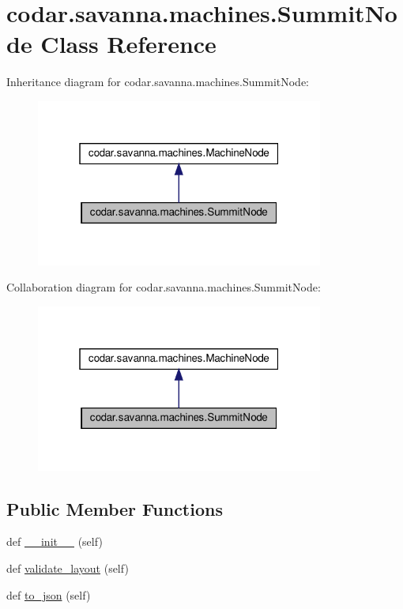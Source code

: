 \hypertarget{classcodar_1_1savanna_1_1machines_1_1_summit_node}{}\section{codar.\+savanna.\+machines.\+Summit\+Node Class Reference}
\label{classcodar_1_1savanna_1_1machines_1_1_summit_node}


Inheritance diagram for codar.\+savanna.\+machines.\+Summit\+Node\+:
\nopagebreak
\begin{figure}[H]
\begin{center}
\leavevmode
\includegraphics[width=268pt]{classcodar_1_1savanna_1_1machines_1_1_summit_node__inherit__graph}
\end{center}
\end{figure}


Collaboration diagram for codar.\+savanna.\+machines.\+Summit\+Node\+:
\nopagebreak
\begin{figure}[H]
\begin{center}
\leavevmode
\includegraphics[width=268pt]{classcodar_1_1savanna_1_1machines_1_1_summit_node__coll__graph}
\end{center}
\end{figure}
\subsection*{Public Member Functions}
\begin{DoxyCompactItemize}
\item 
def \hyperlink{classcodar_1_1savanna_1_1machines_1_1_summit_node_acc0c2a15d2204b3d5f547200fd4d055f}{\+\_\+\+\_\+init\+\_\+\+\_\+} (self)
\item 
def \hyperlink{classcodar_1_1savanna_1_1machines_1_1_summit_node_a3360461b2a21624400e0ecdf052c8447}{validate\+\_\+layout} (self)
\item 
def \hyperlink{classcodar_1_1savanna_1_1machines_1_1_summit_node_a7db80709d8a4ebc806559a03b9be8b68}{to\+\_\+json} (self)
\end{DoxyCompactItemize}
